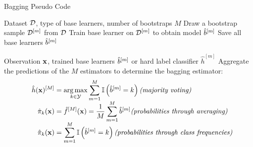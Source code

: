 \documentclass[11pt,compress,t,notes=noshow, xcolor=table]{beamer}
\begin{document}
\begin{vbframe}{Bagging Pseudo Code}
\begin{algorithm}[H]
  \scriptsize
  \caption*{Bagging algorithm: Training}
  \begin{algorithmic}[1]
     Dataset $\mathcal{D}$, type of base learners, number of bootstraps $M$
      \State Draw a bootstrap sample $\mathcal{D}^{[m]}$ from $\mathcal{D}$
      \State Train base learner on $\mathcal{D}^{[m]}$ to obtain model $\hat{b}^{[m]}$
    \EndFor
    \State Save all base learners $\hat{b}^{[m]}$
  \end{algorithmic}
\end{algorithm}
\vspace{-2ex}
\begin{algorithm}[H]
  \scriptsize
  \caption*{Bagging algorithm: Prediction in case of classification}
  \begin{algorithmic}[1]
     Observation $\mathbf{x}$, trained base learners $\hat{b}^{[m]}$ or hard label classifier $\hat{h}^{[m]}$
    \State Aggregate the predictions of the $M$ estimators to determine the bagging estimator:
    \vspace{-2ex}
    \begin{align*}
    \quad \hat{h}(\mathbf{x})^{[M]} &= \operatorname*{arg\,max}_{k \in \mathcal{Y}} \sum_{m=1}^M \mathbb{I}\left(\hat{b}^{[m]} = k\right) \textit{(majority voting)}\\[-1ex]
     \hat \pi_{k}(\mathbf{x}) &= \hat f^{[M]}(\mathbf{x}) = \frac{1}{M} \sum_{m=1}^M \hat{b}^{[m]} \textit{(probabilities through averaging)}\\[-1ex]
    \hat \pi_{k}(\mathbf{x}) &= \sum_{m=1}^M \mathbb{I}\left(\hat{b}^{[m]} = k\right) \textit{(probabilities through class frequencies)}
    \end{align*}
    \vspace{-3ex}
  \end{algorithmic}
\end{algorithm}
\vspace{-3ex}
\end{vbframe}
\end{document}

